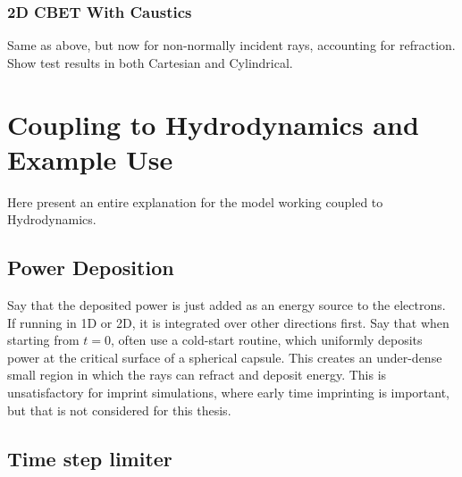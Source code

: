 \subsubsection{2D \ac{CBET} With Caustics}
\label{sec:SOLAS_CBET_caustic_test}
Same as above, but now for non-normally incident rays, accounting for refraction.
Show test results in both Cartesian and Cylindrical.


\section{Coupling to Hydrodynamics and Example Use}

Here present an entire explanation for the model working coupled to Hydrodynamics.

\subsection{Power Deposition}

Say that the deposited power is just added as an energy source to the electrons.
If running in 1D or 2D, it is integrated over other directions first.
Say that when starting from $t=0$, often use a cold-start routine, which uniformly deposits power at the critical surface of a spherical capsule.
This creates an under-dense small region in which the rays can refract and deposit energy.
This is unsatisfactory for imprint simulations, where early time imprinting is important, but that is not considered for this thesis.

\subsection{Time step limiter} \label{dtlaser}


